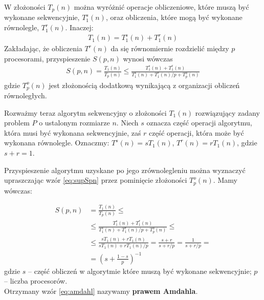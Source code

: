 W złożoności \(T_{p}(n)\) można wyróżnić operacje obliczeniowe, które muszą być wykonane sekwencyjnie, \(T^{s}_{1}(n)\), oraz obliczenia, które mogą być wykonane równolegle, \(T^{r}_{1}(n)\). Inaczej:
\begin{align}
T_{1}(n) = T^{s}_{1}(n) + T^{r}_{1}(n)
\end{align}
Zakładając, że obliczenia \(T^{r}(n)\) da się równomiernie rozdzielić między \(p\) procesorami, przyspieszenie \(S(p, n)\) wynosi wówczas
\begin{align}\label{eq:supSpn}
S(p, n) = \frac{T_{1}(n)}{T_{p}(n)}\leq\frac{T^{s}_{1}(n) + T^{r}_{1}(n)}{T^{s}_{1}(n) + T^{r}_{1}(n)/p + T^{o}_{p}(n)}
\end{align}
gdzie \(T^{o}_{p}(n)\) jest złożonością dodatkową wynikającą z organizacji obliczeń równoległych.


Rozważmy teraz algorytm sekwencyjny o złożoności \(T_{1}(n)\) rozwiązujący zadany problem \(P\) o ustalonym rozmiarze \(n\). Niech \(s\) oznacza część operacji algorytmu, która musi być wykonana sekwencyjnie, zaś \(r\) część operacji, która może być wykonana równolegle. Oznaczmy: \(T^{s}(n) = sT_{1}(n)\), \(T^{r}(n)=rT_{1}(n)\), gdzie \(s+r=1\). 


Przyspieszenie algorytmu uzyskane po jego zrównolegleniu można wyznaczyć upraszczając wzór \eqref{eq:supSpn} przez pominięcie złożoności \(T^{o}_{p}(n)\). Mamy wówczas:

\begin{equation*}\label{eq:amdahl}
\begin{split}
S(p, n) &= \frac{T_{1}(n)}{T_{p}(n)}\leq\\
&\leq \frac{T^{s}_{1}(n) + T^{r}_{1}(n)}{T^{s}_{1}(n) + T^{r}_{1}(n)/p + T^{o}_{p}(n)}\leq\\
&\leq \frac{sT_{1}(n) + rT_{1}(n)}{sT_{1}(n) + rT_{1}(n)/p} = \frac{s+r}{s+r/p} = \frac{1}{s+r/p}= \\
&= \left(s+\frac{1-s}{p}\right)^{-1}
\end{split}
\end{equation*}
gdzie \(s\) – część obliczeń w algorytmie które muszą być wykonane sekwencyjnie; \(p\) – liczba procesorów.\\
Otrzymany wzór \eqref{eq:amdahl} nazywamy \textbf{prawem Amdahla}. 

